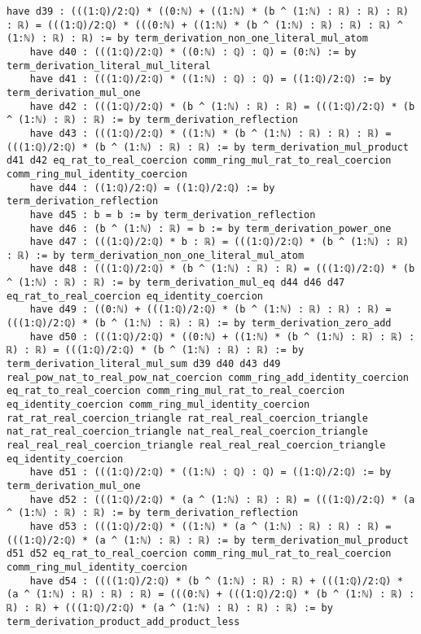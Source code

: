 \documentclass{article}
\begin{document}
\begin{tcolorbox}[colback=white!10, width=\linewidth]
\begin{lstlisting}[language=Lean4]
    have d39 : (((1:ℚ)/2:ℚ) * ((0:ℕ) + ((1:ℕ) * (b ^ (1:ℕ) : ℝ) : ℝ) : ℝ) : ℝ) = (((1:ℚ)/2:ℚ) * (((0:ℕ) + ((1:ℕ) * (b ^ (1:ℕ) : ℝ) : ℝ) : ℝ) ^ (1:ℕ) : ℝ) : ℝ) := by term_derivation_non_one_literal_mul_atom
    have d40 : (((1:ℚ)/2:ℚ) * ((0:ℕ) : ℚ) : ℚ) = (0:ℕ) := by term_derivation_literal_mul_literal
    have d41 : (((1:ℚ)/2:ℚ) * ((1:ℕ) : ℚ) : ℚ) = ((1:ℚ)/2:ℚ) := by term_derivation_mul_one
    have d42 : (((1:ℚ)/2:ℚ) * (b ^ (1:ℕ) : ℝ) : ℝ) = (((1:ℚ)/2:ℚ) * (b ^ (1:ℕ) : ℝ) : ℝ) := by term_derivation_reflection
    have d43 : (((1:ℚ)/2:ℚ) * ((1:ℕ) * (b ^ (1:ℕ) : ℝ) : ℝ) : ℝ) = (((1:ℚ)/2:ℚ) * (b ^ (1:ℕ) : ℝ) : ℝ) := by term_derivation_mul_product d41 d42 eq_rat_to_real_coercion comm_ring_mul_rat_to_real_coercion comm_ring_mul_identity_coercion
    have d44 : ((1:ℚ)/2:ℚ) = ((1:ℚ)/2:ℚ) := by term_derivation_reflection
    have d45 : b = b := by term_derivation_reflection
    have d46 : (b ^ (1:ℕ) : ℝ) = b := by term_derivation_power_one
    have d47 : (((1:ℚ)/2:ℚ) * b : ℝ) = (((1:ℚ)/2:ℚ) * (b ^ (1:ℕ) : ℝ) : ℝ) := by term_derivation_non_one_literal_mul_atom
    have d48 : (((1:ℚ)/2:ℚ) * (b ^ (1:ℕ) : ℝ) : ℝ) = (((1:ℚ)/2:ℚ) * (b ^ (1:ℕ) : ℝ) : ℝ) := by term_derivation_mul_eq d44 d46 d47 eq_rat_to_real_coercion eq_identity_coercion
    have d49 : ((0:ℕ) + (((1:ℚ)/2:ℚ) * (b ^ (1:ℕ) : ℝ) : ℝ) : ℝ) = (((1:ℚ)/2:ℚ) * (b ^ (1:ℕ) : ℝ) : ℝ) := by term_derivation_zero_add
    have d50 : (((1:ℚ)/2:ℚ) * ((0:ℕ) + ((1:ℕ) * (b ^ (1:ℕ) : ℝ) : ℝ) : ℝ) : ℝ) = (((1:ℚ)/2:ℚ) * (b ^ (1:ℕ) : ℝ) : ℝ) := by term_derivation_literal_mul_sum d39 d40 d43 d49 real_pow_nat_to_real_pow_nat_coercion comm_ring_add_identity_coercion eq_rat_to_real_coercion comm_ring_mul_rat_to_real_coercion eq_identity_coercion comm_ring_mul_identity_coercion rat_rat_real_coercion_triangle rat_real_real_coercion_triangle nat_rat_real_coercion_triangle nat_real_real_coercion_triangle real_real_real_coercion_triangle real_real_real_coercion_triangle eq_identity_coercion
    have d51 : (((1:ℚ)/2:ℚ) * ((1:ℕ) : ℚ) : ℚ) = ((1:ℚ)/2:ℚ) := by term_derivation_mul_one
    have d52 : (((1:ℚ)/2:ℚ) * (a ^ (1:ℕ) : ℝ) : ℝ) = (((1:ℚ)/2:ℚ) * (a ^ (1:ℕ) : ℝ) : ℝ) := by term_derivation_reflection
    have d53 : (((1:ℚ)/2:ℚ) * ((1:ℕ) * (a ^ (1:ℕ) : ℝ) : ℝ) : ℝ) = (((1:ℚ)/2:ℚ) * (a ^ (1:ℕ) : ℝ) : ℝ) := by term_derivation_mul_product d51 d52 eq_rat_to_real_coercion comm_ring_mul_rat_to_real_coercion comm_ring_mul_identity_coercion
    have d54 : ((((1:ℚ)/2:ℚ) * (b ^ (1:ℕ) : ℝ) : ℝ) + (((1:ℚ)/2:ℚ) * (a ^ (1:ℕ) : ℝ) : ℝ) : ℝ) = (((0:ℕ) + (((1:ℚ)/2:ℚ) * (b ^ (1:ℕ) : ℝ) : ℝ) : ℝ) + (((1:ℚ)/2:ℚ) * (a ^ (1:ℕ) : ℝ) : ℝ) : ℝ) := by term_derivation_product_add_product_less

\end{lstlisting}
\end{tcolorbox}
\end{document}
